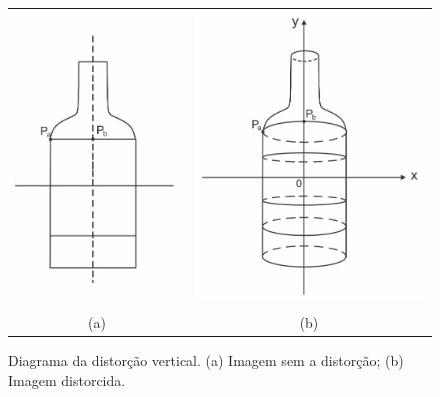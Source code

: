 \begin{figure}[ht]
    \caption{Diagrama da distorção vertical. (a) Imagem sem a distorção; (b) Imagem distorcida.}     
    \centering
    \vspace{0.3cm}
    \begin{minipage}{.5\textwidth}
      \centering
            \begin{tabular}{cc}
            \includegraphics[width=.5\linewidth]{TCC/Imagens/dia_vert_plan.jpg} 
            &
            \includegraphics[width=.55\linewidth]{TCC/Imagens/diag_vert_dist.jpg}
            \\
            (a) & (b)
            \end{tabular}
	\end{minipage}
    \label{fig:dist_vert}
\end{figure}

